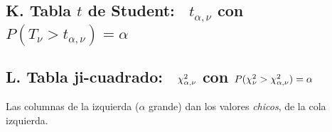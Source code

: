 \newpage
\subsection*{K. Tabla $t$ de Student: \ $t_{\alpha,\nu}$ con $P(T_\nu>t_{\alpha,\nu})=\alpha$}
\begin{center}
\small\setlength{\tabcolsep}{9pt}\renewcommand{\arraystretch}{0.98}

\end{center}

\newpage
\subsection*{L. Tabla ji-cuadrado: \ $\chi^2_{\alpha,\nu}$ con $P(\chi^2_\nu>\chi^2_{\alpha,\nu})=\alpha$}
Las columnas de la izquierda ($\alpha$ grande) dan los valores \emph{chicos}, de la cola izquierda.
\begin{center}
\footnotesize\setlength{\tabcolsep}{3.6pt}

\end{center}
